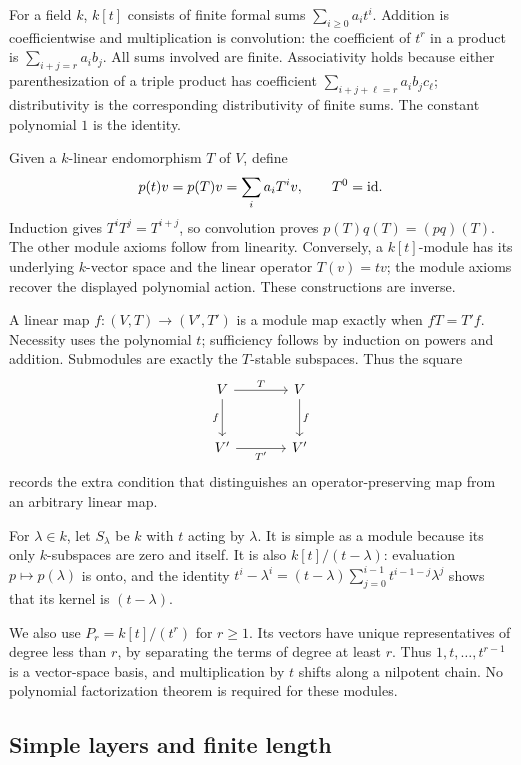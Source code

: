 For a field $k$, $k[t]$ consists of finite formal sums
$\sum_{i\geq0}a_it^i$. Addition is coefficientwise and multiplication
is convolution: the coefficient of $t^r$ in a product is
$\sum_{i+j=r}a_ib_j$. All sums involved are finite. Associativity
holds because either parenthesization of a triple product has coefficient
$\sum_{i+j+\ell=r}a_ib_jc_\ell$; distributivity is the corresponding
distributivity of finite sums. The constant polynomial $1$ is the identity.

Given a $k$-linear endomorphism $T$ of $V$, define
\[
 p(t)v=p(T)v=\sum_i a_iT^iv,\qquad T^0=\mathrm{id}.
\]
Induction gives $T^iT^j=T^{i+j}$, so convolution proves
$p(T)q(T)=(pq)(T)$. The other module axioms follow from linearity.
Conversely, a $k[t]$-module has its underlying $k$-vector space and
the linear operator $T(v)=tv$; the module axioms recover the displayed
polynomial action. These constructions are inverse.

A linear map $f:(V,T)\to(V',T')$ is a module map exactly when
$fT=T'f$. Necessity uses the polynomial $t$; sufficiency follows by
induction on powers and addition. Submodules are exactly the
$T$-stable subspaces. Thus the square
\[
\begin{tikzcd}[column sep=large,row sep=large]
V\arrow[r,"T"]\arrow[d,"f"']&V\arrow[d,"f"]\\
V'\arrow[r,"T'"']&V'
\end{tikzcd}
\]
records the extra condition that distinguishes an operator-preserving
map from an arbitrary linear map.

For $\lambda\in k$, let $S_\lambda$ be $k$ with $t$ acting by
$\lambda$. It is simple as a module because its only $k$-subspaces
are zero and itself. It is also $k[t]/(t-\lambda)$: evaluation
$p\mapsto p(\lambda)$ is onto, and the identity
$t^i-\lambda^i=(t-\lambda)\sum_{j=0}^{i-1}t^{i-1-j}\lambda^j$
shows that its kernel is $(t-\lambda)$.

We also use $P_r=k[t]/(t^r)$ for $r\geq1$. Its vectors have unique
representatives of degree less than $r$, by separating the terms of
degree at least $r$. Thus $1,t,\ldots,t^{r-1}$ is a vector-space
basis, and multiplication by $t$ shifts along a nilpotent chain.
No polynomial factorization theorem is required for these modules.

\subsection{Simple layers and finite length}
\label{m:length-foundations}

